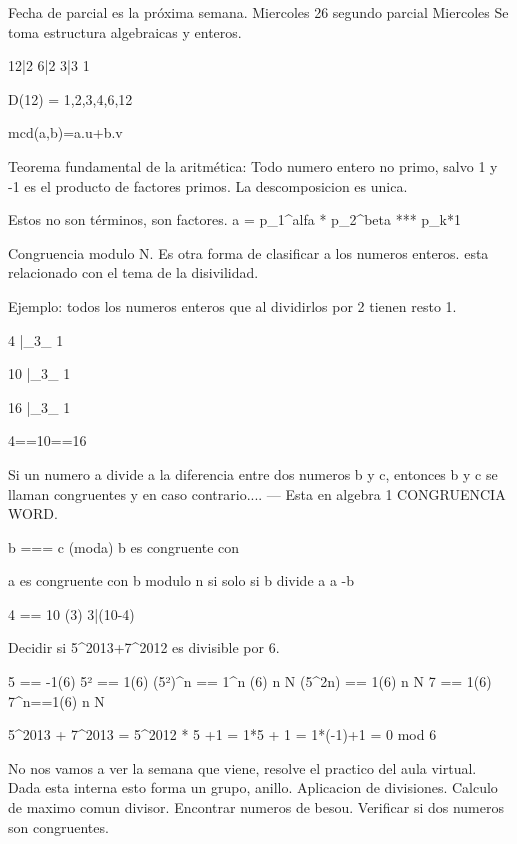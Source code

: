 Fecha de parcial es la próxima semana.
Miercoles 26 segundo parcial
Miercoles 
Se toma estructura algebraicas y enteros.

12|2
 6|2
 3|3
 1


D(12) = {1,2,3,4,6,12}

mcd(a,b)=a.u+b.v


Teorema fundamental de la aritmética:
Todo numero entero no primo, salvo 1 y -1 es el producto de factores primos.
La descomposicion es unica.

Estos no son términos, son factores.
a = p_1^alfa * p_2^beta *** p_k*1


Congruencia modulo N.
Es otra forma de clasificar a los numeros enteros.
esta relacionado con el tema de la disivilidad.

Ejemplo: todos los numeros enteros que al dividirlos por 2 tienen resto  1.

4 |_3_
1

10 |_3_
1

16 |_3_
1


4==10==16

Si un numero a divide a la diferencia entre dos numeros b y c, entonces b y c se llaman congruentes y en caso contrario.... --- Esta en algebra 1 CONGRUENCIA WORD.

b === c (moda) 
b es congruente con 

a es congruente con b modulo n si solo si b divide a a -b

4 == 10 (3)
3|(10-4)



Decidir si 5^2013+7^2012 es divisible por 6.

5 == -1(6)
5² == 1(6)
(5²)^n == 1^n (6) \forall n \in N
(5^2n) == 1(6) \forall n \in N
7 == 1(6)
7^n==1(6) \forall n \in N


5^2013 + 7^2013 = 5^2012 * 5 +1 = 1*5 + 1 = 1*(-1)+1 = 0 mod 6


No nos vamos a ver la semana que viene, resolve el practico del aula virtual.
Dada esta interna esto forma un grupo, anillo.
Aplicacion de divisiones.
Calculo de maximo comun divisor.
Encontrar numeros de besou.
Verificar si dos numeros son congruentes.

